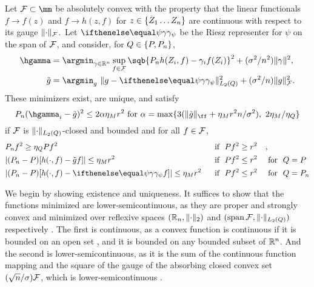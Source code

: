 \begin{lemm}
\label{lemma:abstract-finite-sample}
Let $\F \subset \mm$ be absolutely convex with the property that the linear functionals $f \to f(z)$ and $f \to h(z,f)$ for $z \in \{Z_1 \ldots Z_n\}$ are continuous with respect to its gauge $\lVert\cdot\rVert_{\mathcal{F}}$.\footnotemark\  Let $\riesz[\psi]$ be the Riesz representer for $\psi$ on the span of $\mathcal{F}$,
and consider, for $Q \in \set{\P,\Pn}$,
\begin{align*}
\hgamma &= \argmin_{\gamma \in \R^n}\sup_{f \in \F}  \sqb{\Pn h(Z_i, f) - \gamma_i f(Z_i)}^2 + (\sigma^2/n^2)\norm{\gamma}^2, \\
\tilde g  &= \argmin_{g} \ \norm{g - \riesz[\psi]}_{L_2(Q)}^2 + (\sigma^2/n)\norm{g}_{\F}^2. 
\end{align*}
These minimizers exist, are unique, and satisfy
\[ \Pn (\hgamma_i - \tilde g)^2 \le 2\alpha \eta_M r^2 \text{ for } \alpha = \max\set{3(\norm{\gapprox}_{\ff} + \eta_M r^2 n/\sigma^2),\ 2\eta_M/\eta_Q} \]
if $\mathcal{F}$ is $\lVert\cdot\rVert_{L_2(Q)}$-closed and bounded and for all $f \in \mathcal{F}$, 
\begin{equation}
\label{eq:ratio-process-bounds}
\begin{aligned}
& \Pn f^2 \ge \eta_Q \P f^2 
&&\text{ if }\  \P f^2 \ge r^2 &&, \\
&\abs{(\Pn-\P)[ h(\cdot,f) - \gapprox f]} \le \eta_M r^2\
&&\text{ if  }\ \P f^2 \le r^2 && \text{ for }\ Q=\P \\
 &\abs{(\Pn-\P)[ h(\cdot,f) - \riesz[\psi] f]} \le \eta_M r^2\
&&\text{ if  }\ \P f^2 \le r^2 && \text{ for }\ Q=\Pn \\
\end{aligned}
\end{equation}
\end{lemm}
We begin by showing existence and uniqueness. It suffices to show that the functions minimized are lower-semicontinuous,
as they are proper and strongly convex and minimized over reflexive spaces $(\mathbb{R}_n, \lVert\cdot\rVert_2)$ 
and $(\operatorname*{span} \mathcal{F}, \lVert\cdot\rVert_{L_2(Q)})$ respectively \citep[Corollary 2.20]{peypouquet2015convex}. The first is continuous, as 
a convex function is continuous if it is bounded on an open set \citep[Theorem 5.43]{aliprantis2006infinite},
and it is bounded on any bounded subset of $\mathbb{R}^n$. And the second is lower-semicontinuous,
as it is the sum of the continuous function mapping \smash{$g \to \norm{g - \riesz[\psi]}_{L_2(Q)}^2$} and 
the square of the gauge of the absorbing closed convex set $(\sqrt{n}/\sigma)\mathcal{F}$, which is lower-semicontinuous \citep[Theorem 5.52]{aliprantis2006infinite}.

